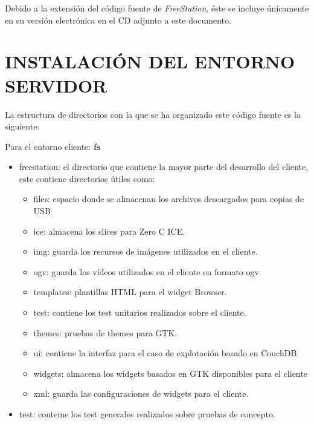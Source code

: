     Debido a la extensión del código fuente de \emph{FreeStation}, éste se
    incluye únicamente en su versión electrónica en el CD adjunto a este documento.
    
    \section{\uppercase{Instalación del entorno servidor}}
    
    La estructura de directorios con la que se ha organizado este código fuente es la siguiente:

    Para el entorno cliente:
    \textbf{fs}
    
    \begin{itemize}
      \item freestation: el directorio que contiene la mayor parte del
      desarrollo del cliente, este contiene directorios útiles como:
          \begin{itemize}
              \item files: espacio donde se almacenan los archivos descargados
              para copias de USB
              \item ice: almacena los slices para Zero C ICE.
              \item img: guarda los recursos de imágenes utilizados en el
              cliente.
              \item ogv: guarda los vídeos utilizados en el cliente en formato
              ogv
              \item templates: plantillas HTML para el widget Browser.
              \item test: contiene los test unitarios realizados sobre el
              cliente.
              \item themes: pruebas de themes para GTK.
              \item ui: contiene la interfaz para el caso de explotación basado
              en CouchDB
              \item widgets: almacena los widgets basados en GTK disponibles
              para el cliente
              \item xml: guarda las configuraciones de widgets para el cliente.
            \end{itemize}
      \item test: conteine los test generales realizados sobre pruebas de
      concepto.
    \end{itemize}
    
